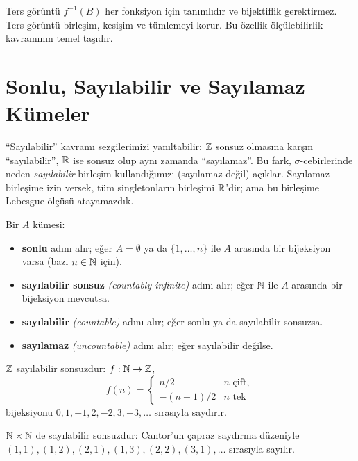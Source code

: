 \begin{mikroozet}[§0.2 özeti]
Ters görüntü $f^{-1}(B)$ her fonksiyon için tanımlıdır ve bijektiflik
gerektirmez. Ters görüntü birleşim, kesişim ve tümlemeyi korur. Bu özellik
ölçülebilirlik kavramının temel taşıdır.
\end{mikroozet}


\section{Sonlu, Sayılabilir ve Sayılamaz Kümeler}

\begin{motivasyon}[§0.3]
``Sayılabilir'' kavramı sezgilerimizi yanıltabilir: $\mathbb{Z}$ sonsuz olmasına
karşın ``sayılabilir'', $\mathbb{R}$ ise sonsuz olup aynı zamanda ``sayılamaz''. Bu
fark, $\sigma$-cebirlerinde neden \emph{sayılabilir} birleşim kullandığımızı
(sayılamaz değil) açıklar. Sayılamaz birleşime izin versek, tüm singletonların
birleşimi $\mathbb{R}$'dir; ama bu birleşime Lebesgue ölçüsü atayamazdık.
\end{motivasyon}

\begin{tanim}[Sayılabilirlik]\label{def:sayilabilir}
Bir $A$ kümesi:
\begin{itemize}
  \item \textbf{sonlu} adını alır; eğer $A = \emptyset$ ya da $\{1,\ldots,n\}$
        ile $A$ arasında bir bijeksiyon varsa (bazı $n \in \mathbb{N}$ için).
  \item \textbf{sayılabilir sonsuz} \emph{(countably infinite)} adını alır;
        eğer $\mathbb{N}$ ile $A$ arasında bir bijeksiyon mevcutsa.
  \item \textbf{sayılabilir} \emph{(countable)} adını alır; eğer sonlu ya da
        sayılabilir sonsuzsa.
  \item \textbf{sayılamaz} \emph{(uncountable)} adını alır; eğer sayılabilir değilse.
\end{itemize}
\end{tanim}

\begin{ornek}\label{ex:sayilabilir}
$\mathbb{Z}$ sayılabilir sonsuzdur: $f: \mathbb{N} \to \mathbb{Z}$,
\[
  f(n) = \begin{cases} n/2 & n \text{ çift}, \\ -(n-1)/2 & n \text{ tek} \end{cases}
\]
bijeksiyonu $0,1,-1,2,-2,3,-3,\ldots$ sırasıyla saydırır.

$\mathbb{N} \times \mathbb{N}$ de sayılabilir sonsuzdur: Cantor'un çapraz saydırma düzeniyle
$(1,1),(1,2),(2,1),(1,3),(2,2),(3,1),\ldots$ sırasıyla sayılır.
\end{ornek}

